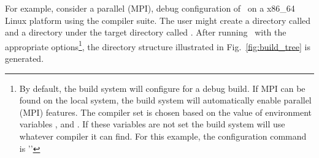 
For example, consider a parallel (MPI), debug configuration of \draco\ on a x86\_64 Linux
platform using the  compiler suite.  The user might create a  directory called
 and a  directory under the target directory called . After running \cmake\ with the
appropriate options\footnote{By default, the build system will configure for a debug build.  If MPI can be found on the local system, the build system will automatically enable parallel (MPI) features. The compiler set is chosen based on the value of environment variables ,  and .  If these variables are not set the build system will use whatever compiler it can find.  For this example, the configuration command is ''},
the directory structure illustrated in Fig.~\ref{fig:build_tree} is generated.
